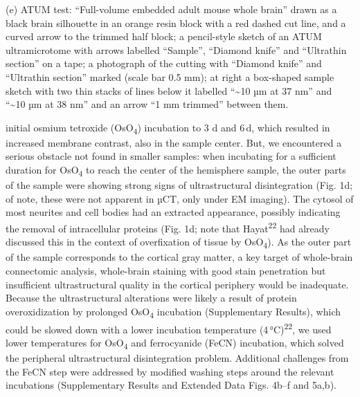 \documentclass{article}
\begin{document}
{(e) ATUM test: ``Full-volume embedded adult mouse whole brain'' drawn as a black brain silhouette in an orange resin block with a red dashed cut line, and a curved arrow to the trimmed half block; a pencil-style sketch of an ATUM ultramicrotome with arrows labelled ``Sample'', ``Diamond knife'' and ``Ultrathin section'' on a tape; a photograph of the cutting with ``Diamond knife'' and ``Ultrathin section'' marked (scale bar 0.5 mm); at right a box-shaped sample sketch with two thin stacks of lines below it labelled ``\textasciitilde 10 µm at 37 nm'' and ``\textasciitilde 10 µm at 38 nm'' and an arrow ``1 mm trimmed'' between them.}

initial osmium tetroxide (OsO\textsubscript{4}) incubation to 3 d and 6\,d, which resulted in increased membrane contrast, also in the sample center. But, we encountered a serious obstacle not found in smaller samples: when incubating for a sufficient duration for OsO\textsubscript{4} to reach the center of the hemisphere sample, the outer parts of the sample were showing strong signs of ultrastructural disintegration (Fig. 1d; of note, these were not apparent in µCT, only under EM imaging). The cytosol of most neurites and cell bodies had an extracted appearance, possibly indicating the removal of intracellular proteins (Fig. 1d; note that Hayat\textsuperscript{22} had already discussed this in the context of overfixation of tissue by OsO\textsubscript{4}). As the outer part of the sample corresponds to the cortical gray matter, a key target of whole-brain connectomic analysis, whole-brain staining with good stain penetration but insufficient ultrastructural quality in the cortical periphery would be inadequate. Because the ultrastructural alterations were likely a result of protein overoxidization by prolonged OsO\textsubscript{4} incubation (Supplementary Results), which could be slowed down with a lower incubation temperature (4\,°C)\textsuperscript{22}, we used lower temperatures for OsO\textsubscript{4} and ferrocyanide (FeCN) incubation, which solved the peripheral ultrastructural disintegration problem. Additional challenges from the FeCN step were addressed by modified washing steps around the relevant incubations (Supplementary Results and Extended Data Figs. 4b–f and 5a,b).
\end{document}
